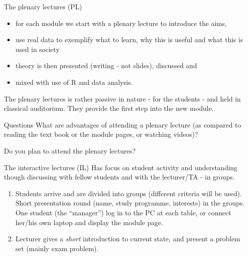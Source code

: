 \documentclass[
  ignorenonframetext,
]{beamer}
\providecommand{\tightlist}{%
  \setlength{\itemsep}{0pt}\setlength{\parskip}{0pt}}
\begin{document}
\begin{frame}
\begin{block}{The plenary lectures (PL)}
\protect\hypertarget{the-plenary-lectures-pl}{}
\begin{itemize}
\tightlist
\item
  for each module we start with a plenary lecture to introduce the aims,
\item
  use real data to exemplify what to learn, why this is useful and what
  this is used in society
\item
  theory is then presented (writing - not slides), discussed and
\item
  mixed with use of R and data analysis.
\end{itemize}

The plenary lectures is rather passive in nature - for the students -
and held in classical auditorium. They provide the first step into the
new module.
\end{block}
\end{frame}

\begin{frame}
\begin{block}{Questions}
\protect\hypertarget{questions}{}
What are advantages of attending a plenary lecture (as compared to
reading the text book or the module pages, or watching videos)?

Do you plan to attend the plenary lectures?
\end{block}
\end{frame}

\begin{frame}
\begin{block}{The interactive lectures (IL)}
\protect\hypertarget{the-interactive-lectures-il}{}
Has focus on student activity and understanding though discussing with
fellow students and with the lecturer/TA - in groups.

\begin{enumerate}
\item
  Students arrive and are divided into groups (different criteria will
  be used). Short presentation round (name, study programme, interests)
  in the groups. One student (the ``manager'') log in to the PC at each
  table, or connect her/his own laptop and display the module page.
\item
  Lecturer gives a \emph{short} introduction to current state, and
  present a problem set (mainly exam problem).
\end{enumerate}
\end{block}
\end{frame}
\end{document}
